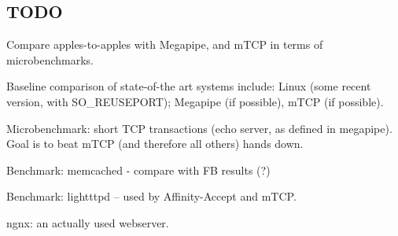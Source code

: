 \subsection{TODO}

\todo Compare apples-to-apples with Megapipe, and mTCP in terms of microbenchmarks.

\todo Baseline comparison of state-of-the art systems include:  Linux (some recent version, with SO\_REUSEPORT); Megapipe (if possible), mTCP (if possible). 

\todo Microbenchmark: short TCP transactions (echo server, as defined in megapipe).   Goal is to beat mTCP (and therefore all others) hands down.

\todo Benchmark: memcached - compare with FB results (?)

\todo Benchmark: lightttpd -- used by Affinity-Accept and mTCP.  

\todo ngnx: an actually used webserver.

